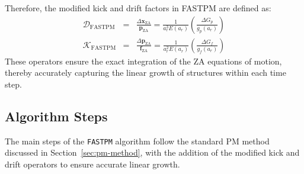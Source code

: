 Therefore, the modified kick and drift factors in FASTPM are defined as:
\begin{eqnarray}
    \mathcal{D}_{\text{FASTPM}} &=& \frac{\Delta \mathbf{x}_{\text{ZA}}}{\mathbf{p}_{\text{ZA}}} 
        = \frac{1}{a_r^3 E(a_r)} \left( \frac{\Delta G_p}{g_p(a_r)} \right) \\[1em]
    \mathcal{K}_{\text{FASTPM}} &=& \frac{\Delta \mathbf{p}_{\text{ZA}}}{\mathbf{f}_{\text{ZA}}} 
        = \frac{1}{a_r^2 E(a_r)} \left( \frac{\Delta G_f}{g_f(a_r)} \right) 
\end{eqnarray}
These operators ensure the exact integration of the ZA equations of motion, thereby accurately capturing the linear growth of structures within each time step.

\subsection{Algorithm Steps}
The main steps of the \texttt{FASTPM} algorithm follow the standard PM method discussed in Section~\ref{sec:pm-method}, with the addition of the modified kick and drift operators to ensure accurate linear growth.

